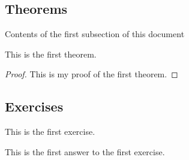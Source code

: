 \subsection{Theorems}
Contents of the first subsection of this document
\begin{theorem}\label{thm:1.1}
    This is the first theorem.
\end{theorem}
\begin{proof}
    This is my proof of the first theorem.
\end{proof}
%
\subsection{Exercises}
\begin{exercise}\label{ex:1.1}
    This is the first exercise.
\end{exercise}
\begin{answer}
    This is the first answer to the first exercise.
\end{answer}
% 
% 